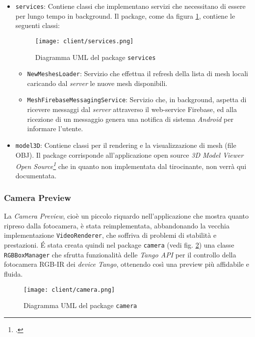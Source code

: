 \begin{itemize}
\item\texttt{services}: Contiene classi che implementano servizi che necessitano di essere per lungo tempo in background. Il package, come da figura \ref{fig:services}, contiene le seguenti classi:
\begin{figure}[!h] 
    \centering 
    \texttt{[image: client/services.png]} 
    \caption{Diagramma UML del package \texttt{services}}
   \label{fig:services}
\end{figure}
	\begin{itemize}
	\item\texttt{NewMeshesLoader}: Servizio che effettua il refresh della lista di mesh locali caricando dal \emph{server} le nuove mesh disponibili.
	\item\texttt{MeshFirebaseMessagingService}: Servizio che, in background, aspetta di ricevere messaggi dal \emph{server} attraverso il web-service Firebase, ed alla ricezione di un messaggio genera una notifica di sistema \emph{Android} per informare l'utente.
	\end{itemize}
\item\texttt{model3D}: Contiene classi per il rendering e la visualizzazione di mesh (file OBJ). Il package corrisponde all'applicazione open source \emph{3D Model Viewer Open Source\footcite{https://play.google.com/store/apps/details?id=org.andresoviedo.dddmodel&hl=it}} che in quanto non implementata dal tirocinante, non verrà qui documentata.
\end{itemize}

\subsubsection{Camera Preview}
La \emph{Camera Preview}, cioè un piccolo riquardo nell'applicazione che mostra quanto ripreso dalla fotocamera, è stata reimplementata, abbandonando la vecchia implementazione \texttt{VideoRenderer}, che soffriva di problemi di stabilità e prestazioni. \'E stata creata quindi nel package \texttt{camera} (vedi fig. \ref{fig:camera}) una classe \texttt{RGBBoxManager} che sfrutta funzionalità delle \emph{Tango API} per il controllo della fotocamera RGB-IR dei \emph{device Tango}, ottenendo così una preview più affidabile e fluida.
\begin{figure}[!h] 
    \centering 
    \texttt{[image: client/camera.png]} 
    \caption{Diagramma UML del package \texttt{camera}}
   \label{fig:camera}
\end{figure}


